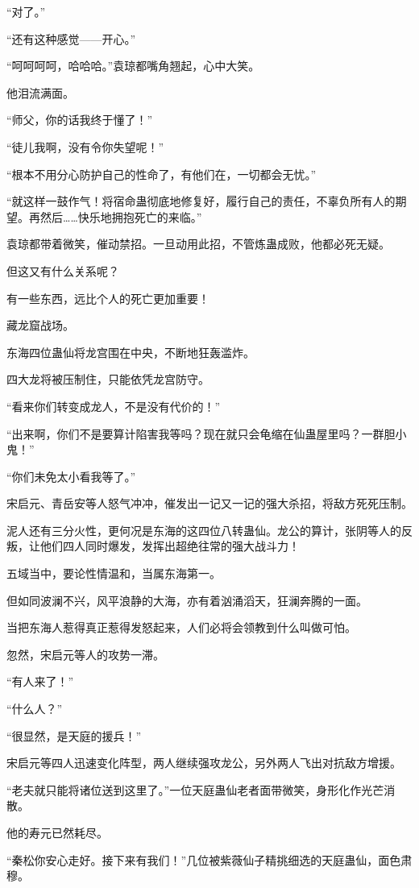 \begin{this_body}
“对了。”

“还有这种感觉——开心。”

“呵呵呵呵，哈哈哈。”袁琼都嘴角翘起，心中大笑。

他泪流满面。

“师父，你的话我终于懂了！”

“徒儿我啊，没有令你失望呢！”

“根本不用分心防护自己的性命了，有他们在，一切都会无忧。”

“就这样一鼓作气！将宿命蛊彻底地修复好，履行自己的责任，不辜负所有人的期望。再然后……快乐地拥抱死亡的来临。”

袁琼都带着微笑，催动禁招。一旦动用此招，不管炼蛊成败，他都必死无疑。

但这又有什么关系呢？

有一些东西，远比个人的死亡更加重要！

藏龙窟战场。

东海四位蛊仙将龙宫围在中央，不断地狂轰滥炸。

四大龙将被压制住，只能依凭龙宫防守。

“看来你们转变成龙人，不是没有代价的！”

“出来啊，你们不是要算计陷害我等吗？现在就只会龟缩在仙蛊屋里吗？一群胆小鬼！”

“你们未免太小看我等了。”

宋启元、青岳安等人怒气冲冲，催发出一记又一记的强大杀招，将敌方死死压制。

泥人还有三分火性，更何况是东海的这四位八转蛊仙。龙公的算计，张阴等人的反叛，让他们四人同时爆发，发挥出超绝往常的强大战斗力！

五域当中，要论性情温和，当属东海第一。

但如同波澜不兴，风平浪静的大海，亦有着汹涌滔天，狂澜奔腾的一面。

当把东海人惹得真正惹得发怒起来，人们必将会领教到什么叫做可怕。

忽然，宋启元等人的攻势一滞。

“有人来了！”

“什么人？”

“很显然，是天庭的援兵！”

宋启元等四人迅速变化阵型，两人继续强攻龙公，另外两人飞出对抗敌方增援。

“老夫就只能将诸位送到这里了。”一位天庭蛊仙老者面带微笑，身形化作光芒消散。

他的寿元已然耗尽。

“秦松你安心走好。接下来有我们！”几位被紫薇仙子精挑细选的天庭蛊仙，面色肃穆。


\end{this_body}
